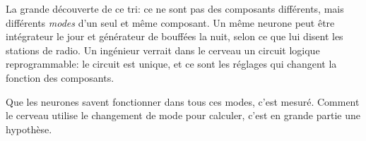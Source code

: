 La grande découverte de ce tri: ce ne sont pas des composants différents, mais différents \emph{modes} d'un seul et même composant. Un même neurone peut être intégrateur le jour et générateur de bouffées la nuit, selon ce que lui disent les stations de radio. Un ingénieur verrait dans le cerveau un circuit logique reprogrammable: le circuit est unique, et ce sont les réglages qui changent la fonction des composants.

Que les neurones savent fonctionner dans tous ces modes, c'est mesuré. Comment le cerveau utilise le changement de mode pour calculer, c'est en grande partie une hypothèse.

